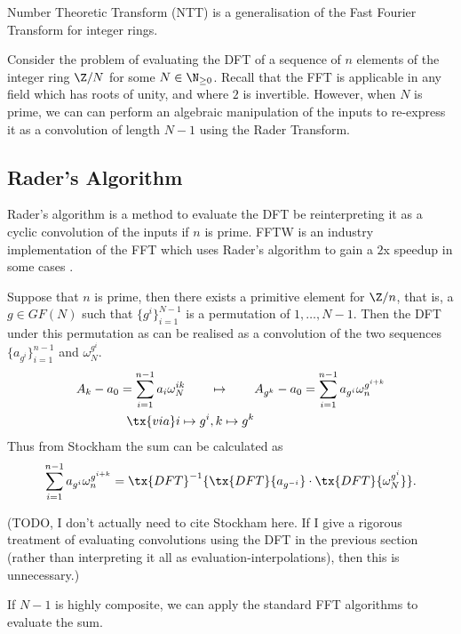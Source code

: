 Number Theoretic Transform (NTT) is a generalisation of the Fast Fourier Transform for integer rings.

Consider the problem of evaluating the DFT of a sequence of $n$ elements of the integer ring $\Z/N$ for some $N \in \N_{\ge 0}$. Recall that the FFT is applicable in any field which has roots of unity, and where $2$ is invertible. However, when $N$ is prime, we can can perform an algebraic manipulation of the inputs to re-express it as a convolution of length $N-1$ using the Rader Transform.

\subsection{Rader's Algorithm}
\label{subsec:rt}

Rader's algorithm is a method to evaluate the DFT be reinterpreting it as a cyclic convolution of the inputs if $n$ is prime. FFTW is an industry implementation of the FFT which uses Rader's algorithm to gain a $2$x speedup in some cases \cite{fftw}.

\begin{theorem}\label{thm:rader-transform}
    Suppose that $n$ is prime, then there exists a primitive element for $\Z/n$, that is, a $g \in GF(N)$ such that $\{g^i\}_{i=1}^{N-1}$ is a permutation of $1, \ldots, N-1$. Then the DFT under this permutation as can be realised as a convolution of the two sequences $\{a_{g^i}\}_{i=1}^{n-1}$ and $\omega_N^{g^i}$.
    \begin{align*}
        A_k - a_0 = \sum^{n-1}_{i=1} a_i \omega_N^{ik} \qquad &\mapsto \qquad A_{g^k} - a_0 = \sum^{n-1}_{i=1} a_{g^i}\omega_n^{g^{i+k}}\\
        \tx{ via } i \mapsto g^i&, k \mapsto g^k
    \end{align*}
    Thus from Stockham \cite{stockham} the sum can be calculated as
    \[
        \sum^{n-1}_{i=1} a_{g^i}\omega_n^{g^{i+k}} = \tx{DFT}^{-1}\{\tx{DFT}\{a_{g^{-i}}\}\cdot \tx{DFT}\{\omega_N^{g^i}\}\}.
    \]
\end{theorem}

(TODO, I don't actually need to cite Stockham here. If I give a rigorous treatment of evaluating convolutions using the DFT in the previous section (rather than interpreting it all as evaluation-interpolations), then this is unnecessary.)

If $N - 1$ is highly composite, we can apply the standard FFT algorithms to evaluate the sum.

